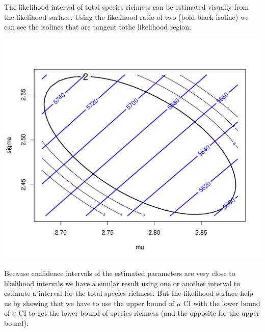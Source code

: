 \documentclass[12pt, A4]{article}\usepackage[]{graphicx}\usepackage[]{color}
\makeatletter
\def\maxwidth{ %
  \ifdim\Gin@nat@width>\linewidth
    \linewidth
  \else
    \Gin@nat@width
  \fi
}
\newenvironment{knitrout}{}{} %
\makeatother
\begin{document}
The likelihood interval of total species richness can be estimated
visually from the likelihood surface. 
Using the likelihood ratio of two (bold black isoline)
we can see the isolines that are tangent tothe likelihood region.

\begin{knitrout}
\color{fgcolor}

{\centering \includegraphics[width=\maxwidth]{figure/PLN_richness_ci-1} 

}



\end{knitrout}

Because confidence intervals of the estimated parameters are very close to likelihood intervals 
we have a similar result using one or another interval to estimate a interval for the total species richness. 
But the likelihood surface help us by showing 
that we have to use the upper bound of $\mu$ CI with the lower bound of $\sigma$ CI
to get the lower bound of species richness (and the opposite for the
upper bound):
\end{document}
